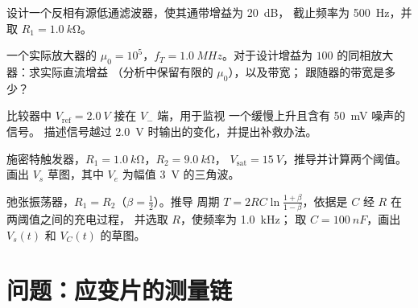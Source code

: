 \begin{exercise}[$\star\star$]\label{exo:b1:operational-amplifier:8}
设计一个反相有源低通滤波器，使其通带增益为 \qty{20}{dB}，
截止频率为 \qty{500}{Hz}，并取 $R_1 = \qty{1.0}{k\ohm}$。
\end{exercise}

\begin{exercise}[$\star\star$]\label{exo:b1:operational-amplifier:9}
一个实际放大器的 $\mu_0 = 10^5$，$f_T = \qty{1.0}{MHz}$。对于设计增益为
$100$ 的同相放大器：求实际直流增益
（分析中保留有限的 $\mu_0$），以及带宽；
跟随器的带宽是多少？
\end{exercise}

\begin{exercise}[$\star\star\star$]\label{exo:b1:operational-amplifier:10}
比较器中 $V_{\mathrm{ref}} = \qty{2.0}{V}$ 接在 $V_-$ 端，用于监视
一个缓慢上升且含有 \qty{50}{mV} 噪声的信号。
描述信号越过 \qty{2.0}{V} 时输出的变化，并提出补救办法。
\end{exercise}

\begin{exercise}[$\star\star\star$]\label{exo:b1:operational-amplifier:11}
施密特触发器，$R_1 = \qty{1.0}{k\ohm}$，$R_2 = \qty{9.0}{k\ohm}$，
$V_{\mathrm{sat}} = \qty{15}{V}$，推导并计算两个阈值。
画出 $V_s$ 草图，其中 $V_e$ 为幅值 \qty{3}{V} 的三角波。
\end{exercise}

\begin{exercise}[$\star\star\star$]\label{exo:b1:operational-amplifier:12}
弛张振荡器，$R_1 = R_2$（$\beta = \tfrac12$）。推导
周期 $T = 2RC\ln\frac{1 + \beta}{1 - \beta}$，依据是 $C$ 经 $R$ 在两阈值之间的充电过程，
并选取 $R$，使频率为 \qty{1.0}{kHz}；
取 $C = \qty{100}{nF}$，画出 $V_s(t)$ 和 $V_C(t)$ 的草图。
\end{exercise}

\section{问题：应变片的测量链}


